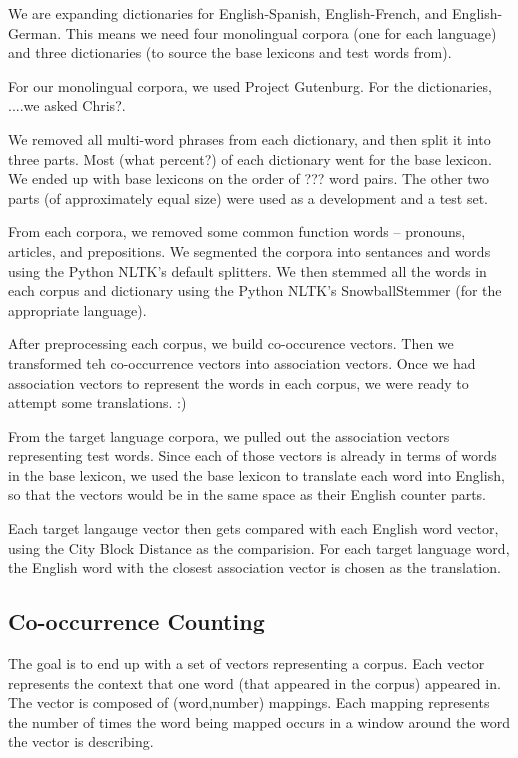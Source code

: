 \documentclass[12pt]{article}
\begin{document}
We are expanding dictionaries for English-Spanish, English-French, and English-
German. This means we need four monolingual corpora (one for each language) and
three dictionaries (to source the base lexicons and test words from).

For our monolingual corpora, we used Project Gutenburg. For the dictionaries,
....we asked Chris?.


We removed all multi-word phrases from each dictionary, and then split it into
three parts. Most (what percent?) of each dictionary went for the base lexicon.
We ended up with base lexicons on the order of ??? word pairs. The other two
parts (of approximately equal size) were used as a development and a test set.

From each corpora, we removed some common function words -- pronouns, articles,
and prepositions. We segmented the corpora into sentances and words using the
Python NLTK's default splitters. We then stemmed all the words in each corpus
and dictionary using the Python NLTK's SnowballStemmer (for the appropriate
language).

After preprocessing each corpus, we build co-occurence vectors. Then we
transformed teh co-occurrence vectors into association vectors. Once we had
association vectors to represent the words in each corpus, we were ready to
attempt some translations. :)


From the target language corpora, we pulled out the association vectors
representing test words. Since each of those vectors is already in terms of
words in the base lexicon, we used the base lexicon to translate each word into
English, so that the vectors would be in the same space as their English counter
parts.

Each target langauge vector then gets compared with each English word vector,
using the City Block Distance as the comparision. For each target language word,
the English word with the closest association vector is chosen as the
translation.

\subsection{Co-occurrence Counting}

The goal is to end up with a set of vectors representing a corpus. Each vector
represents the context that one word (that appeared in the corpus) appeared in.
The vector is composed of (word,number) mappings. Each mapping represents the
number of times the word being mapped occurs in a window around the word the
vector is describing.
\end{document}
